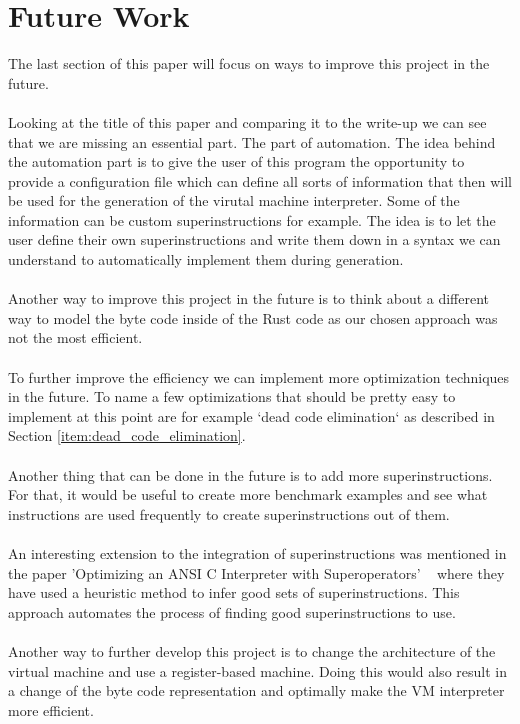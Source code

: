 \documentclass{article}
\begin{document}
\section{Future Work}
\label{sec:future}
The last section of this paper will focus on ways to improve this project
in the future.
\\\\
Looking at the title of this paper and comparing it to the write-up we can see
that we are missing an essential part. The part of automation.
The idea behind the automation part is to give the user of this program
the opportunity to provide a configuration file which can define all 
sorts of information that then will be used for the generation of the
virutal machine interpreter.
Some of the information can be custom superinstructions for example. The idea
is to let the user define their own superinstructions and write them down in a
syntax we can understand to automatically implement them during generation.
\\\\
Another way to improve this project in the future is to think about a different
way to model the byte code inside of the Rust code as our chosen approach was
not the most efficient.
\\\\
To further improve the efficiency we can implement more optimization techniques
in the future. To name a few optimizations that should be pretty easy to
implement at this point are for example `dead code elimination` as described in
Section \ref{item:dead_code_elimination}.
\\\\
Another thing that can be done in the future is to add more superinstructions.
For that, it would be useful to create more benchmark examples and see what
instructions are used frequently to create superinstructions out of them.
\\\\
An interesting extension to the integration of superinstructions was mentioned
in the paper 'Optimizing an ANSI C Interpreter with Superoperators'
~\cite{superoperators} where they have used a heuristic method to infer good
sets of superinstructions. This approach automates the process of finding good
superinstructions to use.
\\\\
Another way to further develop this project is to change the architecture of the
virtual machine and use a register-based machine. Doing this would also result
in a change of the byte code representation and optimally make the VM interpreter
more efficient.

\clearpage


\end{document}
